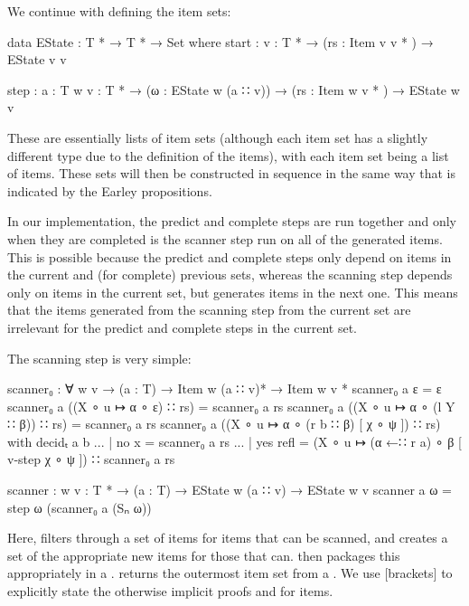		We continue with defining the item sets:

		\begin{code}
			data EState : T * → T * → Set where
			  start : {v : T *} →
			    (rs : Item v v * ) →
			    EState v v

			  step : {a : T} {w v : T *} →
			    (ω : EState w (a ∷ v)) →
			    (rs : Item w v * ) →
			    EState w v
		\end{code}

		These are essentially lists of item sets (although each item set has a
		slightly different type due to the definition of the items), with each
		item set being a list of items. These sets will then be constructed in
		sequence in the same way that is indicated by the Earley propositions.

		In our implementation, the predict and complete steps are run together
		and only when they are completed is the scanner step run on all of the
		generated items. This is possible because the predict and complete
		steps only depend on items in the current and (for complete) previous
		sets, whereas the scanning step depends only on items in the current
		set, but generates items in the next one. This means that the items
		generated from the scanning step from the current set are irrelevant
		for the predict and complete steps in the current set.

		The scanning step is very simple:

		\begin{code}
			scanner₀ : ∀ {w v} →
			  (a : T) →
			  Item w (a ∷ v)* →
			  Item w v *
			scanner₀ a ε = ε
			scanner₀ a ((X ∘ u ↦ α ∘ ε) ∷ rs) = scanner₀ a rs
			scanner₀ a ((X ∘ u ↦ α ∘ (l Y ∷ β)) ∷ rs) = scanner₀ a rs
			scanner₀ a ((X ∘ u ↦ α ∘ (r b ∷ β) [ χ ∘ ψ ]) ∷ rs) with decidₜ a b
			... | no x = scanner₀ a rs
			... | yes refl =
			  (X ∘ u ↦ (α ←∷ r a) ∘ β [ v-step χ ∘ ψ ]) ∷ scanner₀ a rs

			scanner : {w v : T *} →
			  (a : T) →
			  EState w (a ∷ v) →
			  EState w v
			scanner a ω = step ω (scanner₀ a (Sₙ ω))
		\end{code}

		Here,  filters through a set of items for items that
		can be scanned, and creates a set of the appropriate new items for
		those that can.  then packages this appropriately in a
		.  returns the outermost item set from a
		. We use [brackets] to explicitly state the otherwise 
		implicit proofs  and  for items.

